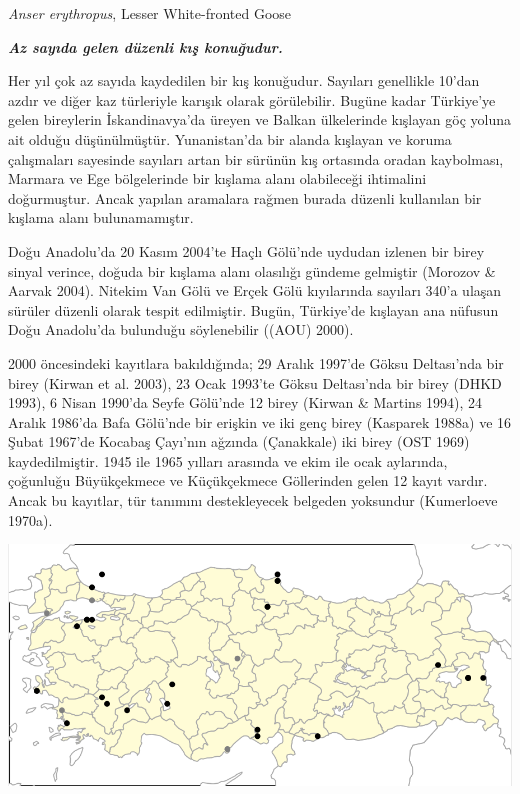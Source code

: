 \documentclass[
  letterpaper,
  DIV=11,
  numbers=noendperiod]{scrreprt}
\begin{document}
\emph{Anser erythropus}, Lesser White-fronted Goose

\textbf{\emph{Az sayıda gelen düzenli kış konuğudur.}}

Her yıl çok az sayıda kaydedilen bir kış konuğudur. Sayıları genellikle
10'dan azdır ve diğer kaz türleriyle karışık olarak görülebilir. Bugüne
kadar Türkiye'ye gelen bireylerin İskandinavya'da üreyen ve Balkan
ülkelerinde kışlayan göç yoluna ait olduğu düşünülmüştür. Yunanistan'da
bir alanda kışlayan ve koruma çalışmaları sayesinde sayıları artan bir
sürünün kış ortasında oradan kaybolması, Marmara ve Ege bölgelerinde bir
kışlama alanı olabileceği ihtimalini doğurmuştur. Ancak yapılan
aramalara rağmen burada düzenli kullanılan bir kışlama alanı
bulunamamıştır.

Doğu Anadolu'da 20 Kasım 2004'te Haçlı Gölü'nde uydudan izlenen bir
birey sinyal verince, doğuda bir kışlama alanı olasılığı gündeme
gelmiştir (Morozov \& Aarvak 2004). Nitekim Van Gölü ve Erçek Gölü
kıyılarında sayıları 340'a ulaşan sürüler düzenli olarak tespit
edilmiştir. Bugün, Türkiye'de kışlayan ana nüfusun Doğu Anadolu'da
bulunduğu söylenebilir ((AOU) 2000).

2000 öncesindeki kayıtlara bakıldığında; 29 Aralık 1997'de Göksu
Deltası'nda bir birey (Kirwan et al. 2003), 23 Ocak 1993'te Göksu
Deltası'nda bir birey (DHKD 1993), 6 Nisan 1990'da Seyfe Gölü'nde 12
birey (Kirwan \& Martins 1994), 24 Aralık 1986'da Bafa Gölü'nde bir
erişkin ve iki genç birey (Kasparek 1988a) ve 16 Şubat 1967'de Kocabaş
Çayı'nın ağzında (Çanakkale) iki birey (OST 1969) kaydedilmiştir. 1945
ile 1965 yılları arasında ve ekim ile ocak aylarında, çoğunluğu
Büyükçekmece ve Küçükçekmece Göllerinden gelen 12 kayıt vardır. Ancak bu
kayıtlar, tür tanımını destekleyecek belgeden yoksundur (Kumerloeve
1970a).

\includegraphics[width=6.25in,height=\textheight]{images/harita_Anser_erythropus.png}
\end{document}
